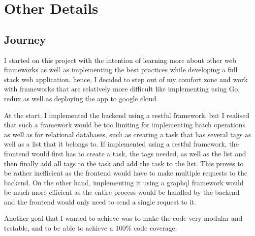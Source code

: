 \documentclass[10pt, a4paper]{article}
\begin{document}
    \section{Other Details}
      \subsection{Journey}
        I started on this project with the intention of learning more about other web frameworks as well as implementing the best practices while developing a full stack web application, hence, I decided to step out of my comfort zone and work with frameworks that are relatively more difficult like implementing using Go, redux as well as deploying the app to google cloud. 

        At the start, I implemented the backend using a restful framework, but I realised that such a framework would be too limiting for implementing batch operations as well as for relational databases, such as creating a task that has several tags as well as a list that it belongs to. If implemented using a restful framework, the frontend would first has to create a task, the tags needed, as well as the list and then finally add all tags to the task and add the task to the list. This proves to be rather inefficient as the frontend would have to make multiple requests to the backend. On the other hand, implementing it using a graphql framework would be much more efficient as the entire process would be handled by the backend and the frontend would only need to send a single request to it.

        Another goal that I wanted to achieve was to make the code very modular and testable, and to be able to achieve a 100\% code coverage. 
\end{document}
